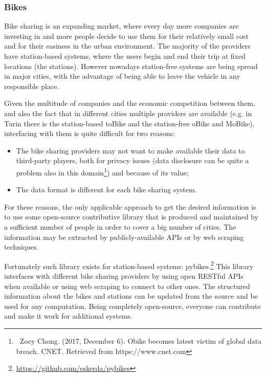 \subsubsection{Bikes}
Bike sharing is an expanding market, where every day more companies are investing in and more people decide to use them for their relatively small cost and for their easiness in the urban environment. The majority of the providers have station-based systems, where the users begin and end their trip at fixed locations (the stations). However nowadays station-free systems are being spread in major cities, with the advantage of being able to leave the vehicle in any responsible place.

Given the multitude of companies and the economic competition between them, and also the fact that in different cities multiple providers are available (e.g. in Turin there is the station-based toBike and the station-free oBike and MoBike), interfacing with them is quite difficult for two reasons:

\begin{itemize}
	\item The bike sharing providers may not want to make available their data to third-party players, both for privacy issues (data disclosure can be quite a problem also in this domain\footnote{\  Zoey Chong. (2017, December 6). Obike becomes latest victim of global data breach. CNET. Retrieved from https://www.cnet.com }) and because of its value;

	\item The data format is different for each bike sharing system.
\end{itemize}

For these reasons, the only applicable approach to get the desired information is to use some open-source contributive library that is produced and maintained by a sufficient number of people in order to cover a big number of cities. The information may be extracted by publicly-available APIs or by web scraping techniques.

Fortunately such library exists for station-based systems: pybikes.\footnote{\url{https://github.com/eskerda/pybikes}} This library interfaces with different bike sharing providers by using open RESTful APIs when available or using web scraping to connect to other ones. The structured information about the bikes and stations can be updated from the source and be used for any computation. Being completely open-source, everyone can contribute and make it work for additional systems.

